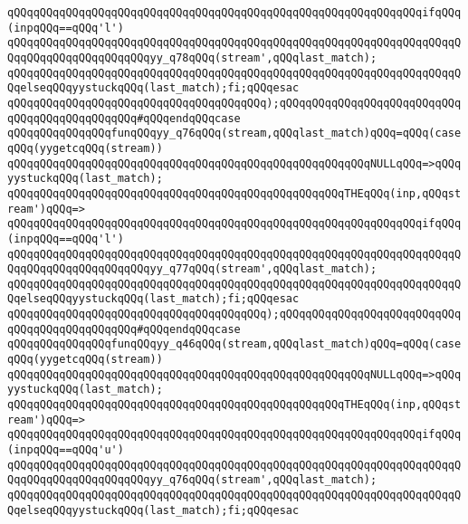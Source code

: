 \verb|qQQqqQQqqQQqqQQqqQQqqQQqqQQqqQQqqQQqqQQqqQQqqQQqqQQqqQQqqQQqqQQqifqQQq(inpqQQq==qQQq'l')|\newline
\verb|qQQqqQQqqQQqqQQqqQQqqQQqqQQqqQQqqQQqqQQqqQQqqQQqqQQqqQQqqQQqqQQqqQQqqQQqqQQqqQQqqQQqqQQqqQQqyy_q78qQQq(stream',qQQqlast_match);|\newline
\verb|qQQqqQQqqQQqqQQqqQQqqQQqqQQqqQQqqQQqqQQqqQQqqQQqqQQqqQQqqQQqqQQqqQQqqQQqelseqQQqyystuckqQQq(last_match);fi;qQQqesac|\newline
\verb|qQQqqQQqqQQqqQQqqQQqqQQqqQQqqQQqqQQqqQQq);qQQqqQQqqQQqqQQqqQQqqQQqqQQqqQQqqQQqqQQqqQQqqQQq#qQQqendqQQqcase|\newline
\verb|qQQqqQQqqQQqqQQqfunqQQqyy_q76qQQq(stream,qQQqlast_match)qQQq=qQQq(caseqQQq(yygetcqQQq(stream))|\newline
\verb|qQQqqQQqqQQqqQQqqQQqqQQqqQQqqQQqqQQqqQQqqQQqqQQqqQQqqQQqNULLqQQq=>qQQqyystuckqQQq(last_match);|\newline
\verb|qQQqqQQqqQQqqQQqqQQqqQQqqQQqqQQqqQQqqQQqqQQqqQQqqQQqTHEqQQq(inp,qQQqstream')qQQq=>|\newline
\verb|qQQqqQQqqQQqqQQqqQQqqQQqqQQqqQQqqQQqqQQqqQQqqQQqqQQqqQQqqQQqqQQqifqQQq(inpqQQq==qQQq'l')|\newline
\verb|qQQqqQQqqQQqqQQqqQQqqQQqqQQqqQQqqQQqqQQqqQQqqQQqqQQqqQQqqQQqqQQqqQQqqQQqqQQqqQQqqQQqqQQqqQQqyy_q77qQQq(stream',qQQqlast_match);|\newline
\verb|qQQqqQQqqQQqqQQqqQQqqQQqqQQqqQQqqQQqqQQqqQQqqQQqqQQqqQQqqQQqqQQqqQQqqQQqelseqQQqyystuckqQQq(last_match);fi;qQQqesac|\newline
\verb|qQQqqQQqqQQqqQQqqQQqqQQqqQQqqQQqqQQqqQQq);qQQqqQQqqQQqqQQqqQQqqQQqqQQqqQQqqQQqqQQqqQQqqQQq#qQQqendqQQqcase|\newline
\verb|qQQqqQQqqQQqqQQqfunqQQqyy_q46qQQq(stream,qQQqlast_match)qQQq=qQQq(caseqQQq(yygetcqQQq(stream))|\newline
\verb|qQQqqQQqqQQqqQQqqQQqqQQqqQQqqQQqqQQqqQQqqQQqqQQqqQQqqQQqNULLqQQq=>qQQqyystuckqQQq(last_match);|\newline
\verb|qQQqqQQqqQQqqQQqqQQqqQQqqQQqqQQqqQQqqQQqqQQqqQQqqQQqTHEqQQq(inp,qQQqstream')qQQq=>|\newline
\verb|qQQqqQQqqQQqqQQqqQQqqQQqqQQqqQQqqQQqqQQqqQQqqQQqqQQqqQQqqQQqqQQqifqQQq(inpqQQq==qQQq'u')|\newline
\verb|qQQqqQQqqQQqqQQqqQQqqQQqqQQqqQQqqQQqqQQqqQQqqQQqqQQqqQQqqQQqqQQqqQQqqQQqqQQqqQQqqQQqqQQqqQQqyy_q76qQQq(stream',qQQqlast_match);|\newline
\verb|qQQqqQQqqQQqqQQqqQQqqQQqqQQqqQQqqQQqqQQqqQQqqQQqqQQqqQQqqQQqqQQqqQQqqQQqelseqQQqyystuckqQQq(last_match);fi;qQQqesac|\newline
